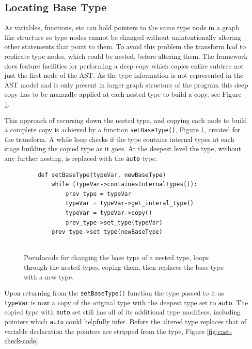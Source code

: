 \documentclass[bsc,frontabs,singlespacing,twoside,parskip,deptreport]{infthesis}
\begin{document}
\subsection{Locating Base Type}\label{sec:auto-loc-base-type}

As variables, functions, etc can hold pointers to the same type node in a graph like structure so type nodes cannot be changed without unintentionally altering other statements that point to them. To avoid this problem the transform had to replicate type nodes, which could be nested, before altering them. The framework does feature facilities for performing a deep copy which copies entire subtree not just the first node of the AST. As the type information is not represented in the AST model and is only present in larger graph structure of the program this deep copy has to be manually applied at each nested type to build a copy, see Figure \ref{fig:code-set-type}. 

This approach of recursing down the nested type, and copying each node to build a complete copy is achieved by a function \texttt{setBaseType()}, Figure \ref{fig:code-set-type}, created for the transform. A while loop checks if the type contains internal types at each stage building the copied type as it goes. At the deepest level the type, without any further nesting, is replaced with the \texttt{auto} type.

\begin{figure}[H]
    \begin{verbatim}
    def setBaseType(typeVar, newBaseType)
        while (typeVar->containesInternalTypes()):
            prev_type = typeVar
            typeVar = typeVar->get_interal_type()
            typeVar = typeVar->copy()
            prev_type->set_type(typeVar)
        prev_type->set_type(newBaseType)    
            
    \end{verbatim}
    \caption{Pseudocode for changing the base type of a nested type, loops through the nested types, coping them, then replaces the base type with a new type.}
    \centering
    \label{fig:code-set-type}
\end{figure}

Upon returning from the \texttt{setBaseType()} function the type passed to it as \texttt{typeVar} is now a copy of the original type with the deepest type set to \texttt{auto}. The copied type with \texttt{auto} set still has all of its additional type modifiers, including pointers which \texttt{auto} could helpfully infer. Before the altered type replaces that of variable declaration the pointers are stripped from the type, Figure \ref{fig:cast-check-code}. 
\end{document}
